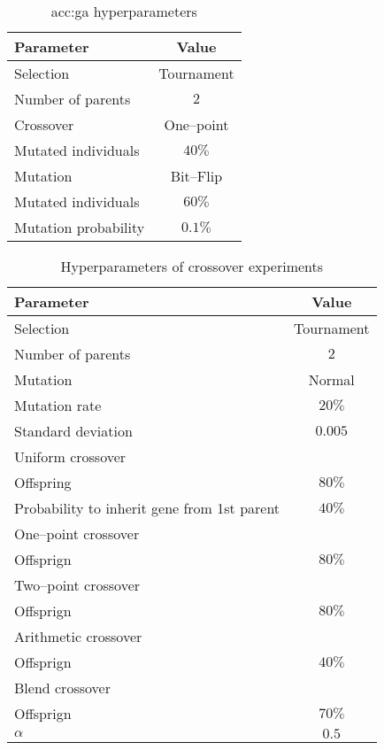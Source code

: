 \begin{table}[ht]
    \centering
    \begin{tabular}{|l|c|}
        \hline
        \textbf{Parameter} & \textbf{Value} \\
        \hline
        Selection & Tournament \\
        \quad Number of parents & $2$ \\
        Crossover & One--point \\
        \quad Mutated individuals & $40\%$ \\
        Mutation & Bit--Flip \\
        \quad Mutated individuals & $60\%$ \\
        \quad Mutation probability & $0.1\%$ \\
        \hline
    \end{tabular}
    \caption{\acrlong*{acc:ga} hyperparameters}
    \label{tab:gahyperparameters}
\end{table}

\begin{table}[ht]
    \centering
    \begin{tabular}{|l|c|}
        \hline
        \textbf{Parameter} & \textbf{Value} \\
        \hline
        Selection & Tournament \\
        \quad Number of parents & $2$ \\
        Mutation & Normal \\
        \quad Mutation rate & $20\%$ \\
        \quad Standard deviation & $0.005$ \\
        \hline
        Uniform crossover & \\
        \quad Offspring & $80\%$ \\
        \quad Probability to inherit gene from 1st parent & $40\%$ \\
        One--point crossover & \\
        \quad Offsprign & $80\%$ \\
        Two--point crossover & \\
        \quad Offsprign & $80\%$ \\
        Arithmetic crossover & \\
        \quad Offsprign & $40\%$ \\
        Blend crossover & \\
        \quad Offsprign & $70\%$ \\
        \quad $\alpha$ & $0.5$ \\
        \hline
    \end{tabular}
    \caption{Hyperparameters of crossover experiments}
    \label{tab:escrossoverhyperparmarameters}
\end{table}

